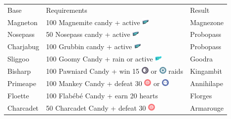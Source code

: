 \begin{table}
\footnotesize
\centering
\begin{tabular}{lll}
  Base & Requirements & Result \\
  \Midrule
  Magneton & 100 Magnemite candy + active \includegraphics[width=1em,height=1em]{images/magneticlure.png} & Magnezone\\
  Nosepass & 50 Nosepass candy + active \includegraphics[width=1em,height=1em]{images/magneticlure.png} & Probopass\\
  Charjabug & 100 Grubbin candy + active \includegraphics[width=1em,height=1em]{images/magneticlure.png} & Probopass\\
  Sliggoo	& 100 Goomy Candy + rain or active \includegraphics[width=1em,height=1em]{images/rainylure.png}& Goodra\\
  Bisharp	& 100 Pawniard Candy + win 15 \includegraphics[width=1em,height=1em]{images/dark.png} or \includegraphics[width=1em,height=1em]{images/steel.png} raids & Kingambit\\
  Primeape & 100 Mankey Candy + defeat 30 \includegraphics[width=1em,height=1em]{images/psychic.png} or \includegraphics[width=1em,height=1em]{images/ghost.png} & Annihilape\\
  Floette	& 100 Flabébé Candy + earn 20 hearts & Florges\\
  Charcadet	& 50 Charcadet Candy + defeat 30 \includegraphics[width=1em,height=1em]{images/psychic.png}& Armarouge\\

\end{tabular}
\end{table}
